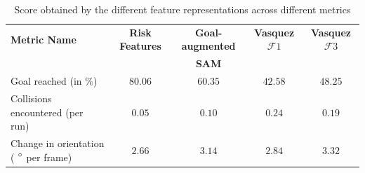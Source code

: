 \begin{table}[htbp]
	\begin{center}
		\renewcommand{\arraystretch}{1.3}
		\begin{tabular}{|p{2.5cm}|c|c|c|c|}
			\hline
			\textbf{Metric Name} & \textbf{Risk Features} & \textbf{Goal-augmented}  & \textbf{Vasquez $\mathcal{F}1$}  & \textbf{Vasquez $\mathcal{F}3$} \\
			&   & \textbf{SAM}  & &  \\
			\hline
			Goal reached (in $\%$) & $80.06$ & $60.35$ & $42.58$ & $48.25$ \\
			Collisions encountered (per run) & $0.05$ & $0.10$ & $ 0.24$ & $0.19$ \\
			Change in orientation ( $\degree$ per frame) & $2.66$ & $3.14$ &  $2.84$ & $3.32$\\ %
			\hline
		\end{tabular}
	\end{center}
	\caption{Score obtained by the different feature representations across different metrics}
	\label{tab:inter_irl_numerical_results_zara02}
\end{table}


